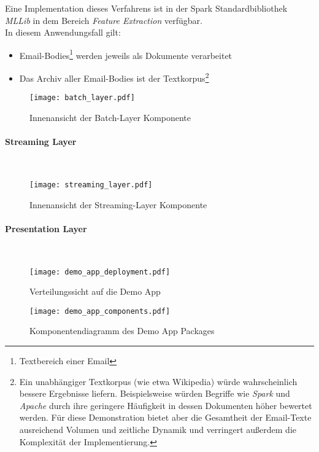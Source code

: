 Eine Implementation dieses Verfahrens ist in der Spark Standardbibliothek \textit{MLLib} in dem Bereich \textit{Feature Extraction} verfügbar.\\

In diesem Anwendungsfall gilt:
\begin{itemize}
\item Email-Bodies\footnote{Textbereich einer Email} werden jeweils als Dokumente verarbeitet
\item Das Archiv aller Email-Bodies ist der Textkorpus\footnote{Ein unabhängiger Textkorpus (wie etwa Wikipedia) würde wahrscheinlich bessere Ergebnisse liefern. Beispielsweise würden Begriffe wie \textit{Spark} und \textit{Apache} durch ihre geringere Häufigkeit in dessen Dokumenten höher bewertet werden. Für diese Demonstration bietet aber die Gesamtheit der Email-Texte ausreichend Volumen und zeitliche Dynamik und verringert außerdem die Komplexität der Implementierung.}
\end{itemize}


\begin{figure}[ht!]
	\centering
  \texttt{[image: batch\_layer.pdf]}
	\caption{Innenansicht der Batch-Layer Komponente}
	\label{figure:demo_app_batchlayer}
\end{figure}

\paragraph{Streaming Layer}\\

\begin{figure}[ht!]
	\centering
  \texttt{[image: streaming\_layer.pdf]}
	\caption{Innenansicht der Streaming-Layer Komponente}
	\label{figure:demo_app_streaminglayer}
\end{figure}

\paragraph{Presentation Layer}\\

\begin{figure}[ht!]
	\centering
  \texttt{[image: demo\_app\_deployment.pdf]}
	\caption{Verteilungssicht auf die Demo App}
	\label{figure:demo_app_verteilung}
\end{figure}


\begin{figure}[ht!]
	\centering
  \texttt{[image: demo\_app\_components.pdf]}
	\caption{Komponentendiagramm des Demo App Packages}
	\label{figure:demo_app_komponenten}
\end{figure}

